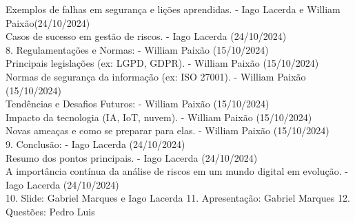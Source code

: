 \documentclass[12pt,oneside,a4paper,article]{abntex2}
\begin{document}
{Exemplos de falhas em segurança e lições aprendidas.  - Iago Lacerda e William Paixão(24/10/2024)\\
Casos de sucesso em gestão de riscos.  - Iago Lacerda (24/10/2024)\\
8. Regulamentações e Normas: - William Paixão (15/10/2024)\\
Principais legislações (ex: LGPD, GDPR). - William Paixão (15/10/2024)\\
Normas de segurança da informação (ex: ISO 27001). - William Paixão (15/10/2024)\\
Tendências e Desafios Futuros: - William Paixão (15/10/2024)\\
Impacto da tecnologia (IA, IoT, nuvem). - William Paixão (15/10/2024)\\
Novas ameaças e como se preparar para elas. - William Paixão (15/10/2024)\\
9. Conclusão:  - Iago Lacerda (24/10/2024)\\
Resumo dos pontos principais.  - Iago Lacerda (24/10/2024)\\
A importância contínua da análise de riscos em um mundo digital em evolução.  - Iago Lacerda (24/10/2024)\\
10. Slide: Gabriel Marques e Iago Lacerda
11. Apresentação: Gabriel Marques
12. Questões: Pedro Luis}
\end{document}
